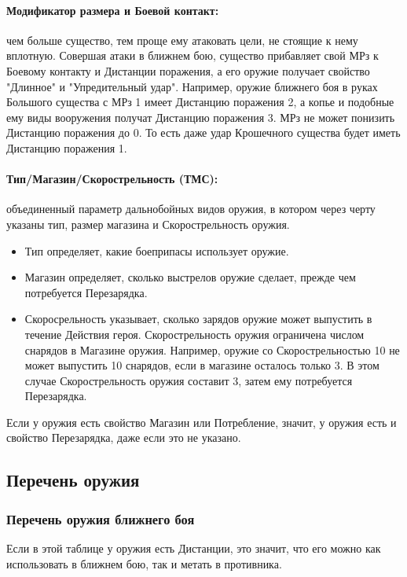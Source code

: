 \paragraph{Модификатор размера и Боевой контакт:} чем больше существо, тем проще ему атаковать цели, не стоящие к нему вплотную. Совершая атаки в ближнем бою, существо прибавляет свой МРз к Боевому контакту и Дистанции поражения, а его оружие получает свойство "Длинное" и "Упредительный удар". Например, оружие ближнего боя в руках Большого существа с МРз 1 имеет Дистанцию поражения 2, а копье и подобные ему виды вооружения получат Дистанцию поражения 3. МРз не может понизить Дистанцию поражения до 0. То есть даже удар Крошечного существа будет иметь Дистанцию поражения 1.

\paragraph{Тип/Магазин/Скорострельность (ТМС):} объединенный параметр дальнобойных видов оружия, в котором через черту указаны тип, размер магазина и Скорострельность оружия.
\begin{itemize}
    \item Тип определяет, какие боеприпасы использует оружие.
    \item Магазин определяет, сколько выстрелов оружие сделает, прежде чем потребуется Перезарядка.
    \item Скоросрельность указывает, сколько зарядов оружие может выпустить в течение Действия героя. Скорострельность оружия ограничена числом снарядов в Магазине оружия. Например, оружие со Скорострельностью 10 не может выпустить 10 снарядов, если в магазине осталось только 3. В этом случае Скорострельность оружия составит 3, затем ему потребуется Перезарядка.
\end{itemize}
\begin{tcolorbox}
    Если у оружия есть свойство Магазин или Потребление, значит, у оружия есть и свойство Перезарядка, даже если это не указано.
\end{tcolorbox}




\newpage
\subsection{Перечень оружия}
\subsubsection{Перечень оружия ближнего боя}
Если в этой таблице у оружия есть Дистанции, это значит, что его можно как использовать в ближнем бою, так и метать в противника.

